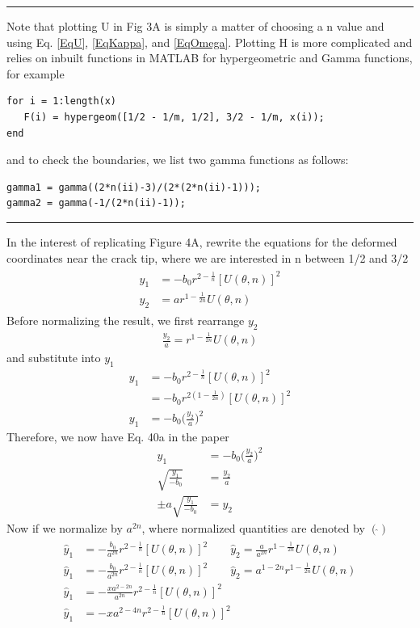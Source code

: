 \documentclass[12pt,3p]{article}
\numberwithin{equation}{section}
\begin{document}
\noindent\rule{\linewidth}{0.5pt} %
Note that plotting U in Fig 3A is simply a matter of choosing a n value and using Eq. \ref{EqU}, \ref{EqKappa}, and \ref{EqOmega}. Plotting H is more complicated and relies on inbuilt functions in MATLAB for hypergeometric and Gamma functions, for example 
\begin{lstlisting}
for i = 1:length(x)
   F(i) = hypergeom([1/2 - 1/m, 1/2], 3/2 - 1/m, x(i));
end
\end{lstlisting}
and to check the boundaries, we list two gamma functions as follows: 
\begin{lstlisting}
gamma1 = gamma((2*n(ii)-3)/(2*(2*n(ii)-1)));
gamma2 = gamma(-1/(2*n(ii)-1));
\end{lstlisting}
\noindent\rule{\linewidth}{0.5pt} %
In the interest of replicating Figure 4A, rewrite the equations for the deformed coordinates near the crack tip, where we are interested in n between 1/2 and 3/2
\begin{align}\label{EqCoord}
\begin{split}
y_1 &= -b_{0} r^{2-\frac{1}{n}}[U(\theta, n)]^{2} \\
y_2 &= a r^{1 - \frac{1}{2n}} U (\theta, n) 
\end{split}
\end{align}
Before normalizing the result, we first rearrange $y_2$
\begin{align*}
\frac{y_2}{a} = r^{1 - \frac{1}{2n}} U (\theta, n) 
\end{align*}
and substitute into $y_1$
\begin{align}
y_1 &= -b_{0} r^{2-\frac{1}{n}} [U(\theta, n)]^{2} \\
	&= -b_{0} r^{2(1 - \frac{1}{2n})} [U(\theta, n)]^{2} \\
y_1 &= -b_0 \bigg( \frac{y_2}{a} \bigg)^2
\end{align}
Therefore, we now have Eq. 40a in the paper
\begin{align}\label{Eq40a}
y_1 &= -b_0 \bigg( \frac{y_2}{a} \bigg)^2 \\
\sqrt{\frac{y_1}{-b_0}} &= \frac{y_2}{a} \\
\pm a \sqrt{\frac{y_1}{-b_0}} &= y_2 
\end{align}
Now if we normalize by $a^{2n}$, where normalized quantities are denoted by $(\hat{})$
\begin{align}
\begin{split}
\hat{y}_1 &= - \frac{b_{0}}{a^{2n}} r^{2-\frac{1}{n}}[U(\theta, n)]^{2} \quad \quad \hat{y}_2 = \frac{a}{a^{2n}} r^{1 - \frac{1}{2n}} U (\theta, n) \\
\hat{y}_1 &= - \frac{b_{0}}{a^{2n}} r^{2-\frac{1}{n}}[U(\theta, n)]^{2} \quad \quad \hat{y}_2 = a^{1-2n} r^{1 - \frac{1}{2n}} U (\theta, n) \\
\hat{y}_1 &= - \frac{x a^{2-2n}}{a^{2n}} r^{2-\frac{1}{n}}[U(\theta, n)]^{2} \\
\hat{y}_1 &= - x a^{2-4n} r^{2-\frac{1}{n}}[U(\theta, n)]^{2} 
\end{split}
\end{align}
\end{document}
